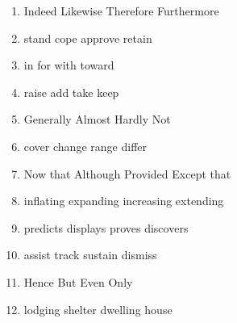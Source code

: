 \newpage
\begin{enumerate}
	\item
\fourchoices
{Indeed}
{Likewise}
{Therefore}
{Furthermore}




\item
\fourchoices
{stand}
{cope}
{approve}
{retain}




\item
\fourchoices
{in}
{for}
{with}
{toward}




\item
\fourchoices
{raise}
{add}
{take}
{keep}




\item

\fourchoices
{Generally}
{Almost}
{Hardly}
{Not}




\item

\fourchoices
{cover}
{change}
{range}
{differ}




\item

\fourchoices
{Now that}
{Although}
{Provided}
{Except that}




\item
\fourchoices
{inflating}
{expanding}
{increasing}
{extending}




\item
\fourchoices
{predicts}
{displays}
{proves}
{discovers}




\item
\fourchoices
{assist}
{track}
{sustain}
{dismiss}




\item

\fourchoices
{Hence}
{But}
{Even}
{Only}




\item

\fourchoices
{lodging}
{shelter}
{dwelling}
{house}





\end{enumerate}
